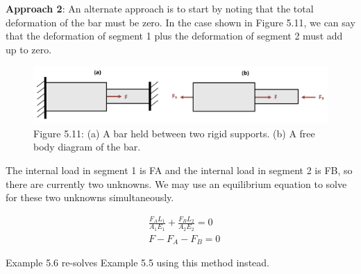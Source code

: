 \documentclass[
  letterpaper,
  DIV=11,
  numbers=noendperiod]{scrreprt}
\begin{document}
\textbf{Approach 2}: An alternate approach is to start by noting that
the total deformation of the bar must be zero. In the case shown in
Figure 5.11, we can say that the deformation of segment 1 plus the
deformation of segment 2 must add up to zero.

\begin{figure}[H]

{\centering \includegraphics{images/PNGs/Figure 5.12.png}

}

\caption{Figure 5.11: (a) A bar held between two rigid supports. (b) A
free body diagram of the bar.}

\end{figure}%

The internal load in segment 1 is FA and the internal load in segment 2
is FB, so there are currently two unknowns. We may use an equilibrium
equation to solve for these two unknowns simultaneously.

\[
\begin{aligned} & \frac{F_A L_1}{A_1 E_1}+\frac{F_B L_2}{A_2 E_2}=0 \\ & F-F_A-F_B=0\end{aligned}\]

Example 5.6 re-solves Example 5.5 using this method instead.
\end{document}
